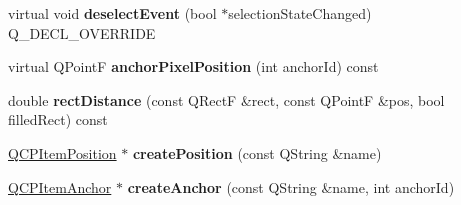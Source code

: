 \begin{DoxyCompactItemize}
\item 
\mbox{\label{class_q_c_p_abstract_item_ac6257547cbfde82121c396d9ed1951af}} 
virtual void {\bfseries deselect\+Event} (bool $\ast$selection\+State\+Changed) Q\+\_\+\+D\+E\+C\+L\+\_\+\+O\+V\+E\+R\+R\+I\+DE
\item 
\mbox{\label{class_q_c_p_abstract_item_a5312a56ca6982bab248fdeb98778299e}} 
virtual Q\+PointF {\bfseries anchor\+Pixel\+Position} (int anchor\+Id) const
\item 
\mbox{\label{class_q_c_p_abstract_item_a7dfc2007e36d09b8b5c988a9f06d6a7e}} 
double {\bfseries rect\+Distance} (const Q\+RectF \&rect, const Q\+PointF \&pos, bool filled\+Rect) const
\item 
\mbox{\label{class_q_c_p_abstract_item_aa77c2a99c9aa91a9128308f4388446fa}} 
\hyperlink{class_q_c_p_item_position}{Q\+C\+P\+Item\+Position} $\ast$ {\bfseries create\+Position} (const Q\+String \&name)
\item 
\mbox{\label{class_q_c_p_abstract_item_a923b24e112879e10ca6eb90d3499c1da}} 
\hyperlink{class_q_c_p_item_anchor}{Q\+C\+P\+Item\+Anchor} $\ast$ {\bfseries create\+Anchor} (const Q\+String \&name, int anchor\+Id)
\end{DoxyCompactItemize}
